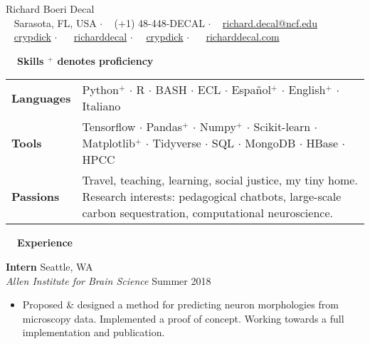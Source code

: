 \documentclass[a4paper,12pt]{article}
\newcommand{\resheading}[1]{{\vspace*{.001in} \colorbox{mygrey}{\begin{minipage}{\textwidth}{\textmd{\large \textbf{#1} \vphantom{p\^{E}}}}\end{minipage}}} }
\newcommand{\ressubheading}[4]{
        \textbf{#1} \hfill #2\\
        \textit{#3} \hfill #4 \\}
\begin{document}
\begin{center}
{\Huge Richard Boeri Decal} \\
{\small \faMapMarker~ Sarasota, FL, USA $\cdot$ \faPhone~ (+1) 48-448-DECAL $\cdot$ \faEnvelope~ \href{mailto:richard.decal@ncf.edu}{richard.decal@ncf.edu}  \\ \faGithubAlt~ \href{https://github.com/crypdick}{crypdick}   $\cdot$ ~\faLinkedin~ \href{https://www.linkedin.com/in/richarddecal/}{richarddecal}  $\cdot$~\faStackOverflow~  \href{https://stackoverflow.com/users/4212158/crypdick}{crypdick} $\cdot$  ~\faHome~  \href{http://www.richarddecal.com}{richarddecal.com}}
\end{center}

\resheading{~~Skills \hfill {\small$^+$ denotes proficiency}}
\vspace{-1em}
\begin{tabularx}{\textwidth}{p{2.1cm}>{\arraybackslash}X}
  \bfseries{Languages} & Python$^+$ $\cdot$ R  $\cdot$ BASH $\cdot$ ECL $\cdot$ Espa\~nol$^+$ $\cdot$ English$^+$ $\cdot$ Italiano \\  %
  \bfseries{Tools} & Tensorflow  $\cdot$ Pandas$^+$ $\cdot$ Numpy$^+$ $\cdot$ Scikit-learn   $\cdot$ \mbox{Matplotlib}$^+$   $\cdot$ Tidyverse $\cdot$ SQL $\cdot$ \mbox{MongoDB} $\cdot$ HBase $\cdot$ HPCC\\
  \bfseries{Passions} & Travel, teaching, learning, social justice, my tiny home. Research interests: pedagogical chatbots, large-scale carbon sequestration, computational neuroscience.
\end{tabularx}


\resheading{~~Experience}

\ressubheading{Intern}{Seattle, WA}{Allen Institute for Brain Science}{Summer 2018}
\begin{itemize}[noitemsep,topsep=0pt,parsep=0pt,partopsep=0pt, nolistsep] \vspace{-10pt}
\item Proposed \& designed a method for predicting neuron morphologies from microscopy data. Implemented a proof of concept. Working towards a full implementation and publication.  \\
\end{itemize}
\end{document}
